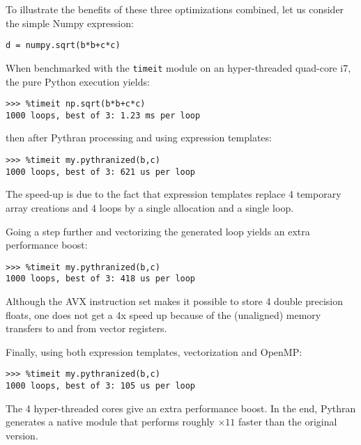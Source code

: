 \documentclass[10pt, onecolumn, preprint]{sigplanconf}
\begin{document}
To illustrate the benefits of these three optimizations combined, let us
consider the simple Numpy expression:

\begin{lstlisting}
d = numpy.sqrt(b*b+c*c)
\end{lstlisting}

When benchmarked with the \texttt{timeit} module on an hyper-threaded quad-core 
i7, the pure Python execution yields: %

\begin{lstlisting}
>>> %timeit np.sqrt(b*b+c*c)
1000 loops, best of 3: 1.23 ms per loop
\end{lstlisting}

\noindent then after Pythran processing and using expression templates:

\begin{lstlisting}
>>> %timeit my.pythranized(b,c)
1000 loops, best of 3: 621 us per loop
\end{lstlisting}

The speed-up is due to the fact that expression templates replace 4 temporary
array creations and 4 loops by a single allocation and a single loop.

Going a step further and vectorizing the generated loop yields an extra
performance boost:

\begin{lstlisting}
>>> %timeit my.pythranized(b,c)
1000 loops, best of 3: 418 us per loop
\end{lstlisting}

Although the AVX instruction set makes it possible to store 4 double precision
floats, one does not get a 4x speed up because of the (unaligned) memory transfers
to and from vector registers.

Finally, using both expression templates, vectorization and OpenMP:

\begin{lstlisting}
>>> %timeit my.pythranized(b,c)
1000 loops, best of 3: 105 us per loop
\end{lstlisting}

The 4 hyper-threaded cores give an extra performance boost. In the end, Pythran
generates a native module that performs roughly $\times11$ faster than the
original version.
\end{document}
